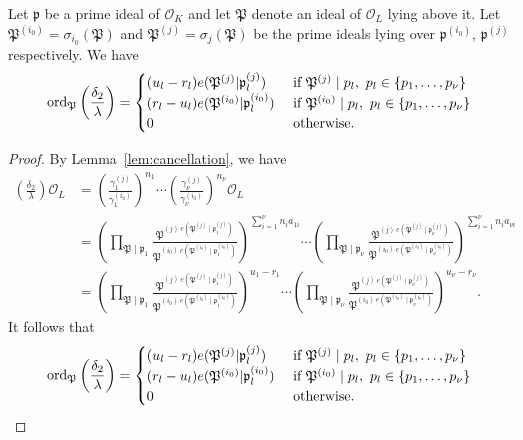 \begin{lemma}\label{lem:ordpz}
Let $\mathfrak{p}$ be a prime ideal of $\mathcal{O}_K$ and let $\mathfrak{P}$ denote an ideal of $\mathcal{O}_L$ lying above it. Let $\mathfrak{P}^{(i_0)} = \sigma_{i_0}(\mathfrak{P})$ and $\mathfrak{P}^{(j)} = \sigma_{j}(\mathfrak{P})$ be the prime ideals lying over $\mathfrak{p}^{(i_0)}$, $\mathfrak{p}^{(j)}$ respectively. We have
\[\operatorname{ord}_{\mathfrak{P}}\left(\frac{\delta_2}{\lambda}\right)=
\begin{cases}
(u_l - r_l)e(\mathfrak{P}^{(j)}|\mathfrak{p}_l^{(j)})	
	& \textnormal{ if } \mathfrak{P}^{(j)} \mid p_l , \ p_l \in \{p_1,\dots, p_{\nu}\}\\
(r_l - u_l)e(\mathfrak{P}^{(i_0)}|\mathfrak{p}_l^{(i_0)})
	& \textnormal{ if } \mathfrak{P}^{(i_0)}\mid p_l, \ p_l \in \{p_1,\dots, p_{\nu}\}\\
0 	& \textnormal{ otherwise}.
\end{cases}\]
\end{lemma}
\begin{proof}

By Lemma~\ref{lem:cancellation}, we have 
\begin{align*}
\left(\frac{\delta_2}{\lambda}\right)\mathcal{O}_L
	& = \left( \frac{\gamma_1^{(j)}}{\gamma_1^{(i_0)}}\right)^{n_1}\cdots \left( \frac{\gamma_{\nu}^{(j)}}{\gamma_{\nu}^{(i_0)}}\right)^{n_{\nu}} \mathcal{O}_L\\
	& = \left(\prod_{\mathfrak{P}\mid\mathfrak{p}_1} \frac{\mathfrak{P}^{(j) \ e(\mathfrak{P}^{(j)}\mid\mathfrak{p}_1^{(j)})}}{\mathfrak{P}^{(i_0) \ e(\mathfrak{P}^{(i_0)}\mid\mathfrak{p}^{(i_0)}_1)}}\right)^{\sum_{i = 1}^\nu n_ia_{1i}} \cdots \left(\prod_{\mathfrak{P}\mid\mathfrak{p}_{\nu}} \frac{\mathfrak{P}^{(j) \ e(\mathfrak{P}^{(j)}\mid\mathfrak{p}^{(j)}_{\nu})}}{\mathfrak{P}^{(i_0) \ e(\mathfrak{P}^{(i_0)}\mid\mathfrak{p}^{(i_0)}_{\nu})}}\right)^{\sum_{i=1}^{\nu} n_ia_{\nu i}}\\
	& = \left(\prod_{\mathfrak{P}\mid\mathfrak{p}_1} \frac{\mathfrak{P}^{(j) \ e(\mathfrak{P}^{(j)}\mid\mathfrak{p}_1^{(j)})}}{\mathfrak{P}^{(i_0) \ e(\mathfrak{P}^{(i_0)}\mid\mathfrak{p}^{(i_0)}_1)}}\right)^{u_1 - r_1} \cdots \left(\prod_{\mathfrak{P}\mid\mathfrak{p}_{\nu}} \frac{\mathfrak{P}^{(j) \ e(\mathfrak{P}^{(j)}\mid\mathfrak{p}^{(j)}_{\nu})}}{\mathfrak{P}^{(i_0) \ e(\mathfrak{P}^{(i_0)}\mid\mathfrak{p}^{(i_0)}_{\nu})}}\right)^{u_{\nu} - r_{\nu}}.
\end{align*}
It follows that 
\[\operatorname{ord}_{\mathfrak{P}}\left( \frac{\delta_2}{\lambda}\right)=
\begin{cases}
(u_l - r_l)e(\mathfrak{P}^{(j)}|\mathfrak{p}_l^{(j)})	
	& \textnormal{ if } \mathfrak{P}^{(j)} \mid p_l , \ p_l \in \{p_1,\dots, p_{\nu}\}\\
(r_l - u_l)e(\mathfrak{P}^{(i_0)}|\mathfrak{p}_l^{(i_0)})
	& \textnormal{ if } \mathfrak{P}^{(i_0)}\mid p_l, \ p_l \in \{p_1,\dots, p_{\nu}\}\\
0 	& \textnormal{ otherwise}.
\end{cases}\]
\end{proof}

